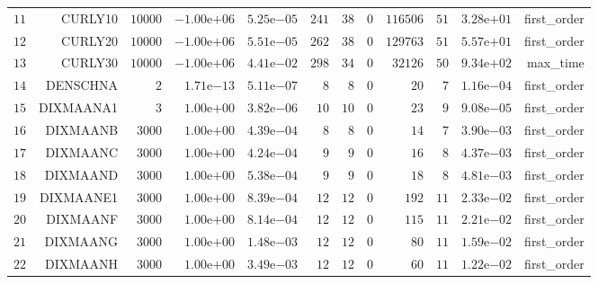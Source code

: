 \begin{longtable}{rrrrrrrrrrrr}
  \(    11\) & CURLY10 & \( 10000\) & \(-1.00\)e\(+06\) & \( 5.25\)e\(-05\) & \(   241\) & \(    38\) & \(     0\) & \(116506\) & \(    51\) & \( 3.28\)e\(+01\) & first\_order \\
  \(    12\) & CURLY20 & \( 10000\) & \(-1.00\)e\(+06\) & \( 5.51\)e\(-05\) & \(   262\) & \(    38\) & \(     0\) & \(129763\) & \(    51\) & \( 5.57\)e\(+01\) & first\_order \\
  \(    13\) & CURLY30 & \( 10000\) & \(-1.00\)e\(+06\) & \( 4.41\)e\(-02\) & \(   298\) & \(    34\) & \(     0\) & \( 32126\) & \(    50\) & \( 9.34\)e\(+02\) & max\_time \\
  \(    14\) & DENSCHNA & \(     2\) & \( 1.71\)e\(-13\) & \( 5.11\)e\(-07\) & \(     8\) & \(     8\) & \(     0\) & \(    20\) & \(     7\) & \( 1.16\)e\(-04\) & first\_order \\
  \(    15\) & DIXMAANA1 & \(     3\) & \( 1.00\)e\(+00\) & \( 3.82\)e\(-06\) & \(    10\) & \(    10\) & \(     0\) & \(    23\) & \(     9\) & \( 9.08\)e\(-05\) & first\_order \\
  \(    16\) & DIXMAANB & \(  3000\) & \( 1.00\)e\(+00\) & \( 4.39\)e\(-04\) & \(     8\) & \(     8\) & \(     0\) & \(    14\) & \(     7\) & \( 3.90\)e\(-03\) & first\_order \\
  \(    17\) & DIXMAANC & \(  3000\) & \( 1.00\)e\(+00\) & \( 4.24\)e\(-04\) & \(     9\) & \(     9\) & \(     0\) & \(    16\) & \(     8\) & \( 4.37\)e\(-03\) & first\_order \\
  \(    18\) & DIXMAAND & \(  3000\) & \( 1.00\)e\(+00\) & \( 5.38\)e\(-04\) & \(     9\) & \(     9\) & \(     0\) & \(    18\) & \(     8\) & \( 4.81\)e\(-03\) & first\_order \\
  \(    19\) & DIXMAANE1 & \(  3000\) & \( 1.00\)e\(+00\) & \( 8.39\)e\(-04\) & \(    12\) & \(    12\) & \(     0\) & \(   192\) & \(    11\) & \( 2.33\)e\(-02\) & first\_order \\
  \(    20\) & DIXMAANF & \(  3000\) & \( 1.00\)e\(+00\) & \( 8.14\)e\(-04\) & \(    12\) & \(    12\) & \(     0\) & \(   115\) & \(    11\) & \( 2.21\)e\(-02\) & first\_order \\
  \(    21\) & DIXMAANG & \(  3000\) & \( 1.00\)e\(+00\) & \( 1.48\)e\(-03\) & \(    12\) & \(    12\) & \(     0\) & \(    80\) & \(    11\) & \( 1.59\)e\(-02\) & first\_order \\
  \(    22\) & DIXMAANH & \(  3000\) & \( 1.00\)e\(+00\) & \( 3.49\)e\(-03\) & \(    12\) & \(    12\) & \(     0\) & \(    60\) & \(    11\) & \( 1.22\)e\(-02\) & first\_order \\

\end{longtable}
